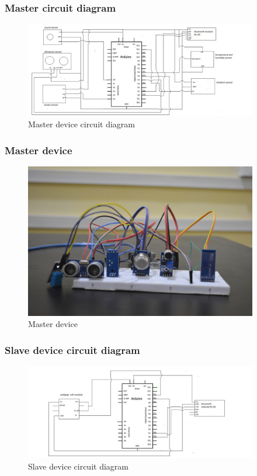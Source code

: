 \documentclass{beamer}
\begin{document}
\begin{frame}\frametitle{Master circuit diagram }
  \begin{figure}[H]
  \centerline{\includegraphics[width=4.0in]{MC.JPG}}
  \caption{ \textbf{}Master device circuit diagram}
  \end{figure}
\end{frame}
\begin{frame}\frametitle{Master device}
  \begin{figure}
  \centerline{\includegraphics[width=4.0in]{master2}}
  \caption{ \textbf{}Master device }
  \end{figure}
\end{frame}
\begin{frame}\frametitle{Slave device circuit diagram}
  \begin{figure}[H]
  \centerline{\includegraphics[width=4.0in]{SC.JPG}}
  \caption{ \textbf{}Slave device circuit diagram}
  \end{figure}
\end{frame}
\end{document}
